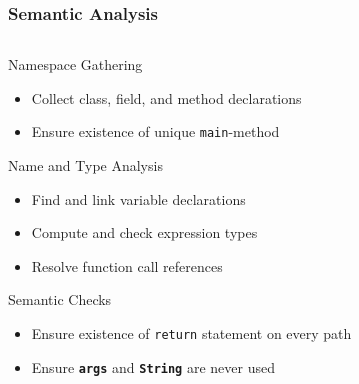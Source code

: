\documentclass[navbaroff,en]{sdqbeamer}
\begin{document}
\begin{frame}
	\frametitle{Semantic Analysis}
	\begin{columns}
		\begin{column}{0.52\textwidth}

			\begin{contentblock}{Namespace Gathering}
				\begin{itemize}
					\item Collect class, field, and method declarations
					\item Ensure existence of unique \texttt{main}-method
				\end{itemize}
			\end{contentblock}


			\begin{contentblock}{Name and Type Analysis}
				\begin{itemize}
					\item Find and link variable declarations
					\item Compute and check expression types
					\item Resolve function call references
				\end{itemize}
			\end{contentblock}


			\begin{contentblock}{Semantic Checks}
				\begin{itemize}
					\item Ensure existence of \texttt{return} statement on every path
					\item Ensure \texttt{\textbf{args}} and \texttt{\textbf{String}} are never used
				\end{itemize}
			\end{contentblock}

		\end{column}


\end{columns}
\end{frame}
\end{document}
